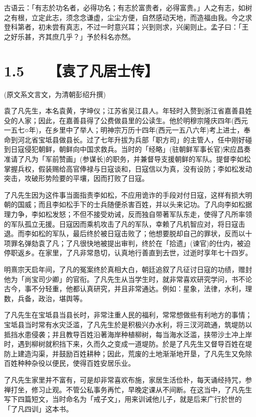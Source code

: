 \documentclass[letterpaper,10pt,english]{sphinxmanual}
\begin{document}
古语云：「有志於功名者，必得功名；有志於富贵者，必得富贵。」人之有志，如树之有根，立定此志，须念念谦虚，尘尘方便，自然感动天地，而造福由我。今之求登科第者，初未尝有真志，不过一时意兴耳；兴到则求，兴阑则止。孟子曰：「王之好乐甚，齐其庶几乎？」予於科名亦然。


\section{1.5   【袁了凡居士传】}
\label{\detokenize{p00_u5176_u5b83/_u8881_u4e86_u51e1-_u4e86_u51e1_u56db_u8bad:id7}}
(原文系文言文，为清朝彭绍升撰)

袁了凡先生，本名袁黄，字坤仪；江苏省吴江县人。年轻时入赘到浙江省嘉善县姓殳的人家；因此，在嘉善县得了公费做县里的公读生。他於明穆宗隆庆四年(西元一五七○年)，在乡里中了举人；明神宗万历十四年(西元一五八六年)考上进士，奉命到河北省宝坻县做县长。过了七年升拔为兵部「职方司」的主管人，任中刚好碰到日寇侵犯朝鲜，朝鲜向中国求救兵。当时的「经略」(驻朝鲜军事长官)宋应昌奏准请了凡为「军前赞画」(参谋长)的职务，并兼督导支援朝鲜的军队。提督李如松掌握兵权，假装赐给高官俸禄与日寇谈和，日寇信以为真，没有设防；李如松发动突击，攻破形势险要的平壤，因而打败了日寇。

了凡先生因为这件事当面指责李如松，不应用诡诈的手段对付日寇，这样有损大明朝的国威；而且李如松手下的士兵随便杀害百姓，并以头来记功。了凡向李如松据理力争，李如松发怒；不但不接受劝诫，反而独自带著军队东走，使得了凡所率领的军队孤立无援。日寇因而乘机攻击了凡的军队，幸赖了凡机智应对，将日寇击退。而李如松的军队，最后终於被日寇击败了；他想要脱却自己的罪状，反而以十项罪名弹劾袁了凡；了凡很快地被提出审判，终於在「拾遗」(谏官)的仕内，被迫停职返乡。在家里，了凡非常恳切，认真地行善直到去世，过逝时享年七十四岁。

明熹宗天启年间，了凡的冤案终於真相大白，朝廷追叙了凡征讨日寇的功绩，赠封他为「尚宝司少卿」的官衔。了凡先生从当学生时，就非常喜欢研究学问，书不论古今，事不分轻重，他都认真研究，并且非常通达。例如：星象，法律，水利，理数，兵备，政治，堪舆等。

了凡先生在宝坻县当县长时，非常注重人民的福利，常常想做些有利地方的事情；宝坻县当时常有水灾泛滥，了凡先生於是积极兴办水利，将三汊河疏通，筑堤防以抵挡水患侵袭；并且教导百姓沿著海岸种植柳树，每当海水泛滥，挟带沙土冲上岸时，遇到柳树就积挡下来，久而久之变成一道堤防。於是了凡先生又督导百姓在堤防上建造沟渠，并鼓励百姓耕种；因此，荒废的土地渐渐地开垦，了凡先生又免除百姓种种杂役以便民，使得百姓安居乐业。

了凡先生家里并不富有，可是却非常喜欢布施，家居生活俭朴，每天诵经持咒，参禅打坐，修习止观。不管公私事务再忙，早晚定课从不间断。在这当中，了凡先生写下四篇短文，当时命名为「戒子文」，用来训诫他儿子，就是后来广行於世的「了凡四训」这本书。
\end{document}
